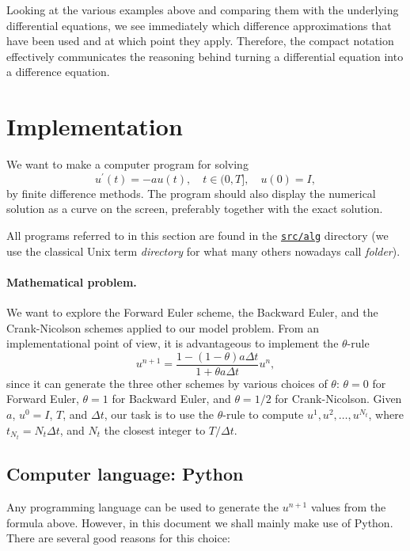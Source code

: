 \documentclass[graybox,sectrefs,envcountresetchap,open=right,final]{svmonodo}
\begin{document}
Looking at the various examples above and comparing them with the
underlying differential equations, we see immediately which difference
approximations that have been used and at which point they
apply. Therefore, the compact notation effectively communicates the
reasoning behind turning a differential equation into a difference
equation.


\section{Implementation}
\label{decay:impl1}

We want to make a computer program for solving
\[
u^{\prime}(t) = -au(t),\quad t\in (0,T], \quad u(0)=I,
\]
by finite difference methods. The program should also display
the numerical solution as a curve on the
screen, preferably together with the
exact solution.

 

All programs referred to in this section are found in the
\href{{http://tinyurl.com/ofkw6kc/alg}}{\nolinkurl{src/alg}} directory (we use the classical
Unix term \emph{directory} for what many others nowadays call \emph{folder}).

\paragraph{Mathematical problem.}
We want to explore the Forward Euler scheme, the
Backward Euler, and the Crank-Nicolson schemes applied to our model problem.
From an implementational point of view, it is advantageous to
implement the $\theta$-rule
\[
u^{n+1} = \frac{1 - (1-\theta) a\Delta t}{1 + \theta a\Delta t}u^n,
\]
since it can generate the three other schemes by various
choices of $\theta$: $\theta=0$ for Forward Euler, $\theta =1$ for
Backward Euler, and $\theta =1/2$ for Crank-Nicolson.
Given $a$, $u^0=I$, $T$, and $\Delta t$,
our task is to use the $\theta$-rule to
compute $u^1, u^2,\ldots,u^{N_t}$, where $t_{N_t}=N_t\Delta t$, and
$N_t$ the closest integer to $T/\Delta t$.

\subsection{Computer language: Python}

Any programming language can be used to generate the $u^{n+1}$ values from
the formula above. However, in this document we shall mainly make use of
Python. There are several good reasons for this choice:
\end{document}
